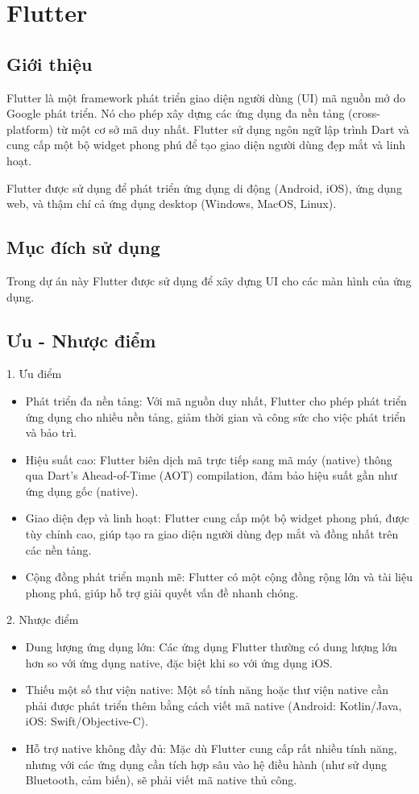 \documentclass[../DoAn.tex]{subfiles}
\begin{document}
\section{Flutter}
\label{section:3.1}

\subsection{Giới thiệu}
\label{subsection:3.1.1}
Flutter là một framework phát triển giao diện người dùng (UI)
 mã nguồn mở do Google phát triển. Nó cho phép xây dựng các ứng dụng
 đa nền tảng (cross-platform) từ một cơ sở mã duy nhất. Flutter sử dụng
 ngôn ngữ lập trình Dart và cung cấp một bộ widget phong phú để tạo 
 giao diện người dùng đẹp mắt và linh hoạt.

Flutter được sử dụng để phát triển ứng dụng di động (Android, iOS), 
ứng dụng web, và thậm chí cả ứng dụng desktop (Windows, MacOS, Linux).

\subsection{Mục đích sử dụng}
\label{subsection:3.1.2}
Trong dự án này Flutter được sử dụng để xây dựng UI cho các màn hình
của ứng dụng.

\subsection{Ưu -  Nhược điểm}
\label{subsection:3.1.3}
1. Ưu điểm
\begin{itemize}
  \item Phát triển đa nền tảng: Với mã nguồn duy nhất, Flutter cho phép phát triển ứng dụng cho nhiều nền tảng, giảm thời gian và công sức cho việc phát triển và bảo trì.
  \item Hiệu suất cao: Flutter biên dịch mã trực tiếp sang mã máy (native) thông qua Dart's Ahead-of-Time (AOT) compilation, đảm bảo hiệu suất gần như ứng dụng gốc (native).
  \item Giao diện đẹp và linh hoạt: Flutter cung cấp một bộ widget phong phú, được tùy chỉnh cao, giúp tạo ra giao diện người dùng đẹp mắt và đồng nhất trên các nền tảng.
  \item Cộng đồng phát triển mạnh mẽ: Flutter có một cộng đồng rộng lớn và tài liệu phong phú, giúp hỗ trợ giải quyết vấn đề nhanh chóng.
\end{itemize}

2. Nhược điểm
\begin{itemize}
  \item Dung lượng ứng dụng lớn: Các ứng dụng Flutter thường có dung lượng lớn hơn so với ứng dụng native, đặc biệt khi so với ứng dụng iOS.
  \item Thiếu một số thư viện native: Một số tính năng hoặc thư viện native cần phải được phát triển thêm bằng cách viết mã native (Android: Kotlin/Java, iOS: Swift/Objective-C).
  \item Hỗ trợ native không đầy đủ: Mặc dù Flutter cung cấp rất nhiều tính năng, nhưng với các ứng dụng cần tích hợp sâu vào hệ điều hành (như sử dụng Bluetooth, cảm biến), sẽ phải viết mã native thủ công.
\end{itemize}
\end{document}

